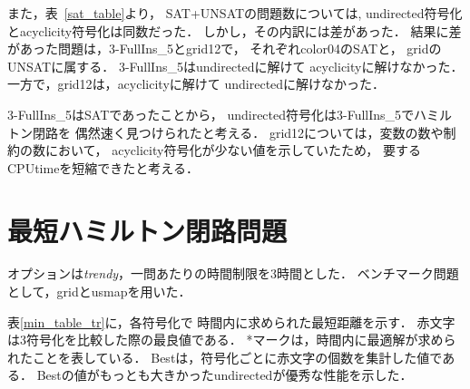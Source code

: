 
また，表~\ref{sat_table}より，
\textsf{SAT+UNSAT}の問題数については,
\textsf{undirected}符号化と\textsf{acyclicity}符号化は同数だった．
しかし，その内訳には差があった．
結果に差があった問題は，\textsf{3-FullIns\_5}と\textsf{grid12}で，
それぞれ\textsf{color04}の\textsf{SAT}と，
\textsf{grid}の\textsf{UNSAT}に属する．
\textsf{3-FullIns\_5}は\textsf{undirected}に解けて
\textsf{acyclicity}に解けなかった．
一方で，\textsf{grid12}は，\textsf{acyclicity}に解けて
\textsf{undirected}に解けなかった．

\textsf{3-FullIns\_5}は\textsf{SAT}であったことから，
\textsf{undirected}符号化は\textsf{3-FullIns\_5}でハミルトン閉路を
偶然速く見つけられたと考える．
\textsf{grid12}については，変数の数や制約の数において，
\textsf{acyclicity}符号化が少ない値を示していたため，
要するCPUtimeを短縮できたと考える．


\section{最短ハミルトン閉路問題}


オプションは\textit{trendy}，一問あたりの時間制限を3時間とした．
ベンチマーク問題として，\textsf{grid}と\textsf{usmap}を用いた．

表\ref{min_table_tr}に，各符号化で
時間内に求められた最短距離を示す．
赤文字は3符号化を比較した際の最良値である．
*マークは，時間内に最適解が求められたことを表している．
Bestは，符号化ごとに赤文字の個数を集計した値である．
Bestの値がもっとも大きかった\textsf{undirected}が優秀な性能を示した．

